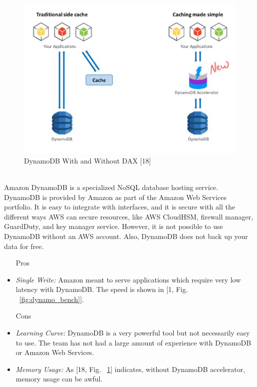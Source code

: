 \documentclass[12pt,journal,compsoc]{IEEEtran}
\newenvironment{subs}
  {\adjustwidth{1em}{0pt}}
  {\endadjustwidth}
\begin{document}
\begin{subs}
\begin{subs}
\begin{subs}
\begin{figure}[H]
\centeringd
\includegraphics[width=5in]{images/dynamo_dax.JPG}
\caption{DynamoDB With and Without DAX [18]}
\label{fig:dynamo_dax}
\end{figure}

\\
Amazon DynamoDB is a specialized NoSQL database hosting service. DynamoDB is provided by Amazon as part of the Amazon Web Services portfolio. It is easy to integrate with interfaces, and it is secure with all the different ways AWS can secure resources, like AWS CloudHSM, firewall manager, GuardDuty, and key manager service. However, it is not possible to use DynamoDB without an AWS account. Also, DynamoDB does not back up your data for free.

\begin{subs}
\begin{itemize}
    \item [{Pros}]
    \item \emph{Single Write:} Amazon meant to serve applications which require very low latency with DynamoDB. The speed is shown in [1, Fig. ~\ref{fig:dynamo_bench}].
    \item [{Cons}]
    \item \emph{Learning Curve:} DynamoDB is a very powerful tool but not necessarily easy to use. The team has not had a large amount of experience with DynamoDB or Amazon Web Services.
    \item \emph{Memory Usage:} As [18, Fig. ~\ref{fig:dynamo_dax}] indicates, without DynamoDB accelerator, memory usage can be awful.
\end{itemize}
\end{subs}


\end{subs}
\end{subs}
\end{subs}
\end{document}
